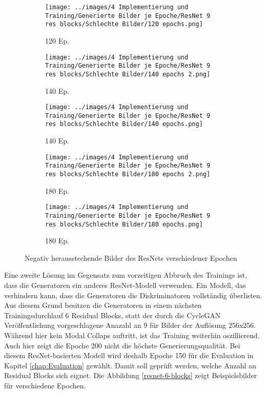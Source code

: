 \begin{figure}[H]
    \centering
    \begin{subfigure}[b]{0.12\textwidth}
        \centering
        \texttt{[image: ../images/4 Implementierung und Training/Generierte Bilder je Epoche/ResNet 9 res blocks/Schlechte Bilder/120 epochs.png]}
        \caption{120 Ep.}
    \end{subfigure}
    \hspace{3em}%
    \begin{subfigure}[b]{0.12\textwidth}
        \centering
        \texttt{[image: ../images/4 Implementierung und Training/Generierte Bilder je Epoche/ResNet 9 res blocks/Schlechte Bilder/140 epochs 2.png]}
        \caption{140 Ep.}
    \end{subfigure}
    \hspace{3em}%
    \begin{subfigure}[b]{0.12\textwidth}
        \centering
        \texttt{[image: ../images/4 Implementierung und Training/Generierte Bilder je Epoche/ResNet 9 res blocks/Schlechte Bilder/140 epochs.png]}
        \caption{140 Ep.}
    \end{subfigure}
    \hspace{3em}%
    \begin{subfigure}[b]{0.12\textwidth}
        \centering
        \texttt{[image: ../images/4 Implementierung und Training/Generierte Bilder je Epoche/ResNet 9 res blocks/Schlechte Bilder/180 epochs 2.png]}
        \caption{180 Ep.}
    \end{subfigure}
    \hspace{3em}%
    \begin{subfigure}[b]{0.12\textwidth}
    \centering
    \texttt{[image: ../images/4 Implementierung und Training/Generierte Bilder je Epoche/ResNet 9 res blocks/Schlechte Bilder/180 epochs.png]}
    \caption{180 Ep.}
\end{subfigure}
        \caption{Negativ herausstechende Bilder des ResNets verschiedener Epochen}
        \label{fig:resnet-schlechte-bilder}
\end{figure}

Eine zweite Lösung im Gegensatz zum vorzeitigen Abbruch des Trainings ist, dass die Generatoren ein anderes ResNet-Modell verwenden. Ein Modell, das verhindern kann, dass die Generatoren die Diskriminatoren vollständig überlisten. Aus diesem Grund besitzen die Generatoren in einem nächsten Trainingsdurchlauf 6 Residual Blocks, statt der durch die \ac{CycleGAN} Veröffentlichung vorgeschlagene Anazahl an 9 für Bilder der Auflösung 256x256. Während hier kein Modal Collaps auftritt, ist das Training weiterhin oszillierend. Auch hier zeigt die Epoche 200 nicht die höchste Generierungsqualität. Bei diesem ResNet-basierten Modell wird deshalb Epoche 150 für die Evaluation in Kapitel \ref{chap:Evaluation} gewählt. Damit soll geprüft werden, welche Anzahl an Residual Blocks sich eignet. Die Abbildung \ref{resnet-6-blocks} zeigt Beispielsbilder für verschiedene Epochen.

